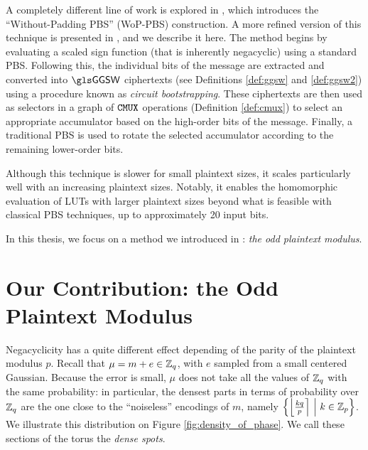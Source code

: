 A completely different line of work is explored in \cite{AC:CLOT21}, which introduces the “Without-Padding \gls{PBS}” (WoP-\gls{PBS}) construction. A more refined version of this technique is presented in \cite{JC:BBBCLO23}, and we describe it here. The method begins by evaluating a scaled sign function (that is inherently negacyclic) using a standard \gls{PBS}. Following this, the individual bits of the message are extracted and converted into $\GGSW$ ciphertexts (see Definitions \ref{def:ggsw} and \ref{def:ggsw2}) using a procedure known as \textit{circuit bootstrapping}. These ciphertexts are then used as selectors in a graph of $\texttt{CMUX}$ operations (Definition \ref{def:cmux}) to select an appropriate accumulator based on the high-order bits of the message. Finally, a traditional \gls{PBS} is used to rotate the selected accumulator according to the remaining lower-order bits.

Although this technique is slower for small plaintext sizes, it scales particularly well with an increasing plaintext sizes. Notably, it enables the homomorphic evaluation of LUTs with larger plaintext sizes beyond what is feasible with classical \gls{PBS} techniques, up to approximately 20 input bits.


In this thesis, we focus on a method we introduced in \cite{TCHES:BonPoiRiv24}: \textit{the odd plaintext modulus}.

\section{Our Contribution: the Odd Plaintext Modulus}
\label{sec:odd_modulus}

Negacyclicity has a quite different effect depending of the parity of the plaintext modulus $p$. Recall that $\mu = m + e \in \mathbb{Z}_q$, with $e$ sampled from a small centered Gaussian. Because the error is small, $\mu$ does not take all the values of $\mathbb{Z}_q$ with the same probability: in particular, the densest parts in terms of probability over $\mathbb{Z}_q$ are the one close to the ``noiseless'' encodings of $m$, namely $\left \{ \left \lfloor \frac {k q}{p} \right \rceil ~\middle |~ k \in \mathbb{Z}_p \right \}$. We illustrate this distribution on Figure \ref{fig:density_of_phase}. We call these sections of the torus the \emph{dense spots}.


